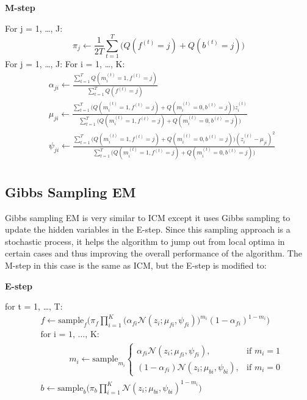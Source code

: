 \documentclass{article} %
\begin{document}
\textbf{M-step}

For j = 1, \ldots , J: 
\begin{equation*}
\pi_j \leftarrow \frac{1}{2T}\sum_{t=1}^T\Bigg(Q(f^{(t)} = j) + Q(b^{(t)} = j)\Bigg)
\end{equation*}
For j = 1, \ldots , J:  For i = 1, \ldots , K: 
\begin{align*} 
&\alpha_{ji} \leftarrow \frac{\sum_{t=1}^T Q(m_i^{(t)}=1,f^{(t)} = j)}{\sum_{t=1}^TQ(f^{(t)} = j)} \\
&\mu_{ji} \leftarrow \frac{\sum_{t=1}^T\Big(Q(m_i^{(t)}=1,f^{(t)} = j) + Q(m_i^{(t)}=0,b^{(t)} = j)\Big)z_i^{(t)}}{\sum_{t=1}^T \Big(Q(m_i^{(t)}=1,f^{(t)} = j) + Q(m_i^{(t)}=0,b^{(t)} = j)\Big)} \\
&\psi_{ji} \leftarrow \frac{\sum_{t=1}^T\Big(Q(m_i^{(t)}=1,f^{(t)} = j) + Q(m_i^{(t)}=0,b^{(t)} = j)\Big)(z_i^{(t)}-\mu_{ji})^2}{\sum_{t=1}^T \Big(Q(m_i^{(t)}=1,f^{(t)} = j) + Q(m_i^{(t)}=0,b^{(t)} = j)\Big)} \\
\end{align*} 

\subsection{Gibbs Sampling EM}
\label{gibbs_em}
Gibbs sampling EM is very similar to ICM except it uses Gibbs sampling to update the hidden variables in the E-step. Since this sampling approach is a stochastic process, it helps the algorithm to jump out from local optima in certain cases and thus improving the overall performance of the algorithm. The M-step in this case is the same as ICM, but the E-step is modified to:

\textbf{E-step}

for t = 1, \ldots , T:
\begin{align*} 
&f \leftarrow \text{sample}_{f}\Bigg(\pi_f \prod_{i=1}^K \Big({\alpha_{fi}\mathcal{N}(z_i;\mu_{fi},\psi_{fi})}\Big)^{m_{i}} {(1-\alpha_{fi})}^{1-m_{i}}\Bigg)\\
&\text{for i = 1, \ldots , K: } \\
& \text{ }\text{ }\text{ }\text{ }\text{ }m_i \leftarrow \text{sample}_{m_i}\begin{cases}
\alpha_{fi}\mathcal{N}(z_i;\mu_{fi},\psi_{fi}), & \text{if $m_i = 1$}\\
(1-\alpha_{fi})\mathcal{N}(z_i;\mu_{bi},\psi_{bi}), & \text{if $m_i = 0$}
\end{cases} \\
&b \leftarrow \text{sample}_{b}\Bigg(\pi_b \prod_{i=1}^K \mathcal{N}(z_i;\mu_{bi},\psi_{bi})^{1-m_{i}}\Bigg)
\end{align*} 
\end{document}
